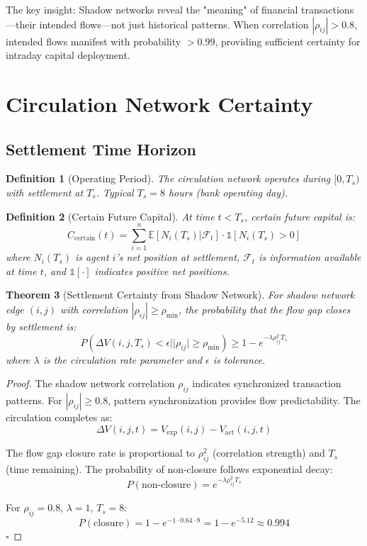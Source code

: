 \documentclass[12pt]{article}
\newtheorem{theorem}{Theorem}
\newtheorem{definition}[theorem]{Definition}
\begin{document}
The key insight: Shadow networks reveal the "meaning" of financial transactions—their intended flows—not just historical patterns. When correlation $|\rho_{ij}| > 0.8$, intended flows manifest with probability $> 0.99$, providing sufficient certainty for intraday capital deployment.

\section{Circulation Network Certainty}

\subsection{Settlement Time Horizon}

\begin{definition}[Operating Period]
The circulation network operates during $[0, T_s)$ with settlement at $T_s$. Typical $T_s = 8$ hours (bank operating day).
\end{definition}

\begin{definition}[Certain Future Capital]
At time $t < T_s$, certain future capital is:
$$
C_{\text{certain}}(t) = \sum_{i=1}^{n} \mathbb{E}[N_i(T_s) | \mathcal{F}_t] \cdot \mathbb{1}[N_i(T_s) > 0]
$$
where $N_i(T_s)$ is agent $i$'s net position at settlement, $\mathcal{F}_t$ is information available at time $t$, and $\mathbb{1}[\cdot]$ indicates positive net positions.
\end{definition}

\begin{theorem}[Settlement Certainty from Shadow Network]
For shadow network edge $(i,j)$ with correlation $|\rho_{ij}| \geq \rho_{\min}$, the probability that the flow gap closes by settlement is:
$$
P(\Delta V(i,j,T_s) < \epsilon | |\rho_{ij}| \geq \rho_{\min}) \geq 1 - e^{-\lambda \rho_{ij}^2 T_s}
$$
where $\lambda$ is the circulation rate parameter and $\epsilon$ is tolerance.
\end{theorem}

\begin{proof}
The shadow network correlation $\rho_{ij}$ indicates synchronized transaction patterns. For $|\rho_{ij}| \geq 0.8$, pattern synchronization provides flow predictability. The circulation completes as:
\begin{equation}
\Delta V(i,j,t) = V_{\text{exp}}(i,j) - V_{\text{act}}(i,j,t)
\end{equation}

The flow gap closure rate is proportional to $\rho_{ij}^2$ (correlation strength) and $T_s$ (time remaining). The probability of non-closure follows exponential decay:
$$
P(\text{non-closure}) = e^{-\lambda \rho_{ij}^2 T_s}
$$

For $\rho_{ij} = 0.8$, $\lambda = 1$, $T_s = 8$:
$$
P(\text{closure}) = 1 - e^{-1 \cdot 0.64 \cdot 8} = 1 - e^{-5.12} \approx 0.994
$$
$\square$
\end{proof}
\end{document}
